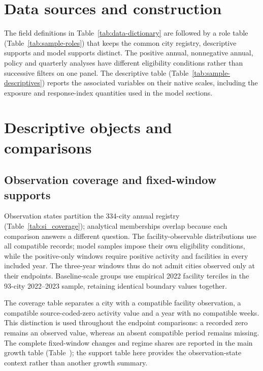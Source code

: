 \section{Data sources and construction}
\label{sec:si-sources}


The field definitions in Table~\ref{tab:data-dictionary} are followed by a
role table (Table~\ref{tab:sample-roles}) that keeps the common city registry,
descriptive supports and model supports distinct.  The positive annual,
nonnegative annual, policy and quarterly analyses have different eligibility
conditions rather than successive filters on one panel.  The
descriptive table (Table~\ref{tab:sample-descriptives}) reports the associated
variables on their native scales, including the exposure and response-index
quantities used in the model sections.



\FloatBarrier
\section{Descriptive objects and comparisons}
\label{sec:si-descriptive}
\subsection{Observation coverage and fixed-window supports}
Observation states partition the 334-city annual registry (Table~\ref{tab:si_coverage});
analytical memberships overlap because each comparison answers a different
question.  The facility-observable distributions use all compatible records; model
samples impose their own eligibility conditions, while the positive-only
windows require positive activity and facilities in every included year.  The three-year windows thus do
not admit cities observed only at their endpoints.  Baseline-scale groups use
empirical 2022 facility terciles in the 93-city 2022--2023 sample, retaining
identical boundary values together.


The coverage table separates a city with a compatible facility observation,
a compatible source-coded-zero activity value and a year with no compatible
weeks.  This distinction is used throughout the endpoint comparisons: a
recorded zero remains an observed value, whereas an absent compatible period
remains missing.  The complete fixed-window changes and regime shares are
reported in the main growth table (Table~); the
support table here provides the observation-state context rather than another
growth summary.

